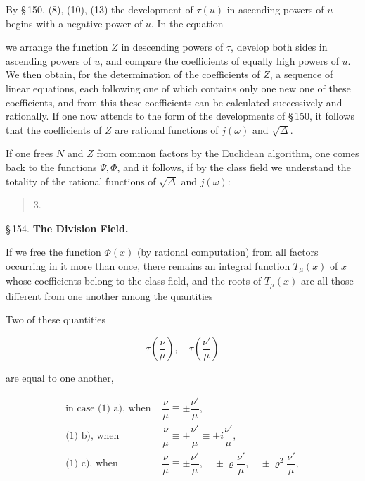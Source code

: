 
By §\,150, (8), (10), (13) the development of $\tau(u)$ in ascending powers of $u$ begins with a negative power of $u$. In the equation


we arrange the function $Z$ in descending powers of $\tau$, develop both sides in ascending powers of $u$, and compare the coefficients of equally high powers of $u$. We then obtain, for the determination of the coefficients of $Z$, a sequence of linear equations, each following one of which contains only one new one of these coefficients, and from this these coefficients can be calculated successively and rationally. If one now attends to the form of the developments of §\,150, it follows that the coefficients of $Z$ are rational functions of $j(\omega)$ and $\sqrt{\Delta}$.

If one frees $N$ and $Z$ from common factors by the Euclidean algorithm, one comes back to the functions $\Psi, \Phi$, and it follows, if by the class field we understand the totality of the rational functions of $\sqrt{\Delta}$ and $j(\omega)$:

\begin{quote}
3. 
\end{quote}

\begin{center}
§\,154. \textbf{The Division Field.}
\end{center}

If we free the function $\Phi(x)$ (by rational computation) from all factors occurring in it more than once, there remains an integral function $T_\mu(x)$ of $x$ whose coefficients belong to the class field, and the roots of $T_\mu(x)$ are all those different from one another among the quantities


Two of these quantities

\[
\tau\left(\frac{\nu}{\mu}\right), \quad \tau\left(\frac{\nu'}{\mu}\right)
\]

are equal to one another,

\[
\begin{array}{rl}
\text{in case (1) a), when } & \dfrac{\nu}{\mu} \equiv \pm\dfrac{\nu'}{\mu}, \\
\text{(1) b), when } & \dfrac{\nu}{\mu} \equiv \pm\dfrac{\nu'}{\mu} \equiv \pm i\dfrac{\nu'}{\mu}, \\
\text{(1) c), when } & \dfrac{\nu}{\mu} \equiv \pm\dfrac{\nu'}{\mu}, \quad \pm\varrho\dfrac{\nu'}{\mu}, \quad \pm\varrho^2\dfrac{\nu'}{\mu},
\end{array}
\]
